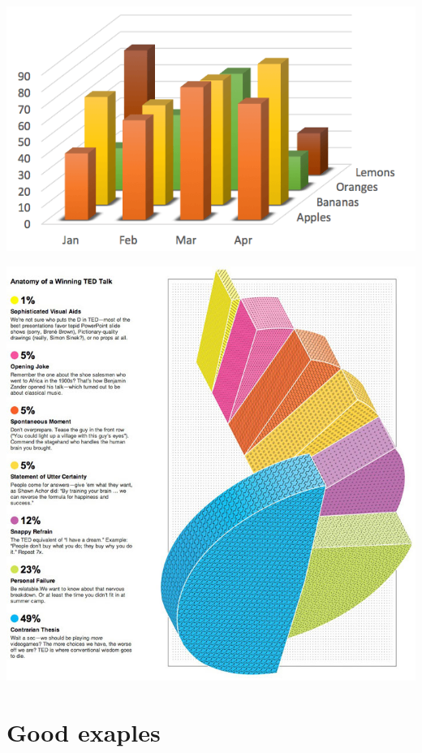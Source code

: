 \documentclass[
]{book}
\begin{document}
\includegraphics{img/vis13.png}

\includegraphics{img/vis15.jpg}

\hypertarget{good-exaples}{%
\section{Good exaples}\label{good-exaples}}
\end{document}
